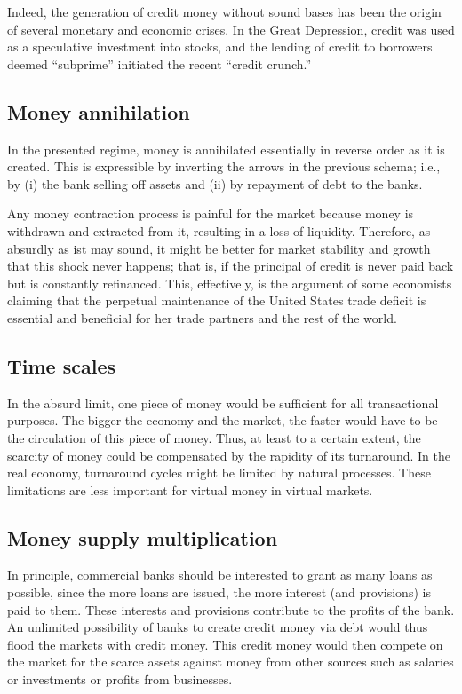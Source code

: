 \documentclass[aps,rmp,preprint,amsfonts,showpacs,showkeys]{revtex4}
\begin{document}
Indeed, the generation of credit money without sound bases has been the origin of several monetary and economic crises.
In the Great Depression, credit was used as a speculative investment into stocks,
and the lending of credit to borrowers deemed ``subprime'' initiated the recent ``credit crunch.''


\subsection{Money annihilation}

In the presented regime, money is annihilated essentially in reverse order as it is created.
This is expressible by inverting the arrows in the previous schema; i.e., by (i) the bank selling off assets and
(ii) by repayment of debt to the banks.

Any money contraction process is painful for the market because money is withdrawn and extracted from it,
resulting in a loss of liquidity.
Therefore, as absurdly as ist may sound, it might be better for market stability and growth that this shock never happens;
that is, if the principal of credit is never paid back but is constantly refinanced.
This, effectively, is the argument of some economists claiming that the perpetual maintenance of the United States trade deficit
is essential and beneficial for her trade partners and the rest of the world.

\subsection{Time scales}

In the absurd limit, one piece of money would be sufficient for all transactional purposes.
The bigger the economy and the market, the faster would have to be the circulation of this piece of money.
Thus, at least to a certain extent, the scarcity of money could be compensated by the rapidity of its turnaround.
In the real economy, turnaround cycles might be limited by natural processes.
These limitations are less important for virtual money in virtual markets.


\subsection{Money supply multiplication}

In principle,  commercial banks should be interested to grant as many loans as possible,
since the more loans are issued, the more interest (and provisions) is paid to them.
These interests and provisions contribute to the profits of the bank.
An unlimited possibility of banks to create credit money via debt would thus flood the markets with credit money.
This credit money would then compete on the market for the scarce assets
against money from other sources such as salaries or investments or profits from businesses.
\end{document}

